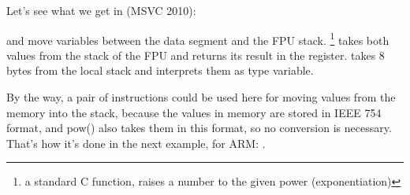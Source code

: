 
Let's see what we get in (MSVC 2010):




\FLD and \FSTP move variables between the data segment and the FPU stack. 
\footnote{a standard C function, raises a number to the given power (exponentiation)}
takes both values from the stack of the FPU and 
returns its result in the  register.
\printf takes 8 bytes from the local stack and interprets them as \Tdouble type variable.

By the way, a pair of \MOV instructions could be used here for moving values from the memory
into the stack, because the values in memory are stored in IEEE 754 format, and pow() also takes them in this
format, so no conversion is necessary.
That's how it's done in the next example, for ARM: .

